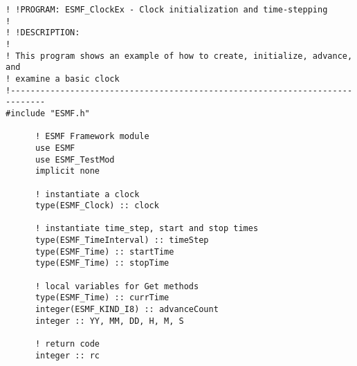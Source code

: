  
\setlength{\oldparskip}{\parskip}
\setlength{\parskip}{1.5ex}
\setlength{\oldparindent}{\parindent}
\setlength{\parindent}{0pt}
\setlength{\oldbaselineskip}{\baselineskip}
\setlength{\baselineskip}{11pt}
 
\def\bv{\begin{verbatim}}
\def\ev{\end{verbatim}}
\def\be{\begin{equation}}
\def\ee{\end{equation}}
\def\bea{\begin{eqnarray}}
\def\eea{\end{eqnarray}}
\def\bi{\begin{itemize}}
\def\ei{\end{itemize}}
\def\bn{\begin{enumerate}}
\def\en{\end{enumerate}}
\def\bd{\begin{description}}
\def\ed{\end{description}}
\def\({\left (}
\def\){\right )}
\def\[{\left [}
\def\]{\right ]}
\def\<{\left  \langle}
\def\>{\right \rangle}
\def\cI{{\cal I}}
\def\diag{\mathop{\rm diag}}
\def\tr{\mathop{\rm tr}}


 

 \begin{verbatim}
! !PROGRAM: ESMF_ClockEx - Clock initialization and time-stepping
!
! !DESCRIPTION:
!
! This program shows an example of how to create, initialize, advance, and
! examine a basic clock
!-----------------------------------------------------------------------------
#include "ESMF.h"

      ! ESMF Framework module
      use ESMF
      use ESMF_TestMod
      implicit none

      ! instantiate a clock 
      type(ESMF_Clock) :: clock

      ! instantiate time_step, start and stop times
      type(ESMF_TimeInterval) :: timeStep
      type(ESMF_Time) :: startTime
      type(ESMF_Time) :: stopTime

      ! local variables for Get methods
      type(ESMF_Time) :: currTime
      integer(ESMF_KIND_I8) :: advanceCount
      integer :: YY, MM, DD, H, M, S

      ! return code
      integer :: rc
 
\end{verbatim}
 
